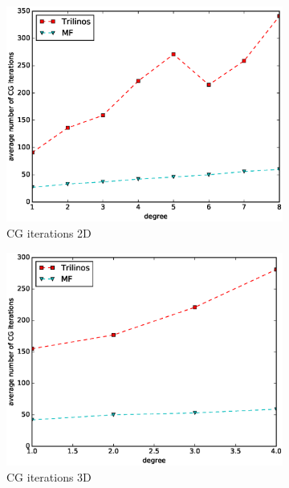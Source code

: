 \documentclass[preprint,12pt,times]{elsarticle}
\begin{document}
\begin{figure}[!ht]
\begin{subfigure}[b]{0.45\textwidth}
    \includegraphics[width=\textwidth]{IWR_cg2d.eps}
    \caption{CG iterations 2D}
    \label{fig:benchmark_miehe_IWR_cg2}
  \end{subfigure}
  \begin{subfigure}[b]{0.45\textwidth}
    \centering
    \includegraphics[width=\textwidth]{IWR_cg3d.eps}
    \caption{CG iterations 3D}
    \label{fig:benchmark_miehe_IWR_cg3}
  \end{subfigure}
  ~
  \begin{subfigure}[b]{0.45\textwidth}
    \centering

\end{subfigure}
\end{figure}
\end{document}
